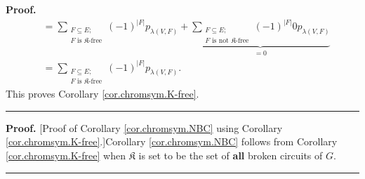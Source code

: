 \documentclass[numbers=enddot,12pt,final,onecolumn,notitlepage]{scrartcl}%
\theoremstyle{definition}
\newenvironment{proof}[1][Proof]{\noindent\textbf{#1.} }{\ \rule{0.5em}{0.5em}}
\newenvironment{verlong}{}{}
\newenvironment{vershort}{}{}
\let\sumnonlimits\sum
\renewcommand{\sum}{\sumnonlimits\limits}
\begin{document}
\begin{verlong}
\begin{proof}
\begin{align*}
&  =\sum_{\substack{F\subseteq E;\\F\text{ is }\mathfrak{K}\text{-free}%
}}\left(  -1\right)  ^{\left\vert F\right\vert }p_{\lambda\left(  V,F\right)
}+\underbrace{\sum_{\substack{F\subseteq E;\\F\text{ is not }\mathfrak{K}%
\text{-free}}}\left(  -1\right)  ^{\left\vert F\right\vert }0p_{\lambda\left(
V,F\right)  }}_{=0}\\
&  =\sum_{\substack{F\subseteq E;\\F\text{ is }\mathfrak{K}\text{-free}%
}}\left(  -1\right)  ^{\left\vert F\right\vert }p_{\lambda\left(  V,F\right)
}.
\end{align*}
This proves Corollary \ref{cor.chromsym.K-free}.
\end{proof}
\end{verlong}

\begin{vershort}
\begin{proof}
[Proof of Corollary \ref{cor.chromsym.NBC} using Corollary
\ref{cor.chromsym.K-free}.]Corollary \ref{cor.chromsym.NBC} follows from
Corollary \ref{cor.chromsym.K-free} when $\mathfrak{K}$ is set to be the set
of \textbf{all} broken circuits of $G$.
\end{proof}
\end{vershort}
\end{document}
